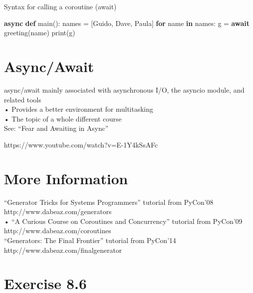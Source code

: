 \documentclass[
  letterpaper,
  DIV=11,
  numbers=noendperiod]{scrreprt}
\newenvironment{Shaded}{\begin{snugshade}}{\end{snugshade}}
\newcommand{\BuiltInTok}[1]{\textcolor[rgb]{0.00,0.23,0.31}{#1}}
\newcommand{\ControlFlowTok}[1]{\textcolor[rgb]{0.00,0.23,0.31}{\textbf{#1}}}
\newcommand{\KeywordTok}[1]{\textcolor[rgb]{0.00,0.23,0.31}{\textbf{#1}}}
\newcommand{\NormalTok}[1]{\textcolor[rgb]{0.00,0.23,0.31}{#1}}
\newcommand{\OperatorTok}[1]{\textcolor[rgb]{0.37,0.37,0.37}{#1}}
\newcommand{\StringTok}[1]{\textcolor[rgb]{0.13,0.47,0.30}{#1}}
\begin{document}
Syntax for calling a coroutine (await)

\begin{Shaded}
\begin{Highlighting}[]
\ControlFlowTok{async} \KeywordTok{def}\NormalTok{ main(): names }\OperatorTok{=}\NormalTok{ [}\StringTok{\textquotesingle{}Guido\textquotesingle{}}\NormalTok{, }\StringTok{\textquotesingle{}Dave\textquotesingle{}}\NormalTok{, }\StringTok{\textquotesingle{}Paula\textquotesingle{}}\NormalTok{] }\ControlFlowTok{for}\NormalTok{ name }\KeywordTok{in}\NormalTok{ names: g }\OperatorTok{=} \ControlFlowTok{await}\NormalTok{ greeting(name) }\BuiltInTok{print}\NormalTok{(g) }
\end{Highlighting}
\end{Shaded}


\chapter{Async/Await}\label{asyncawait-1}

async/await mainly associated with asynchronous I/O, the asyncio module,
and related tools\\
• Provides a better environment for multitasking\\
• The topic of a whole different course\\
See: ``Fear and Awaiting in Async''

https://www.youtube.com/watch?v=E-1Y4kSsAFc


\chapter{More Information}\label{more-information}

``Generator Tricks for Systems Programmers'' tutorial from PyCon'08
http://www.dabeaz.com/generators\\
• ``A Curious Course on Coroutines and Concurrency'' tutorial from
PyCon'09 http://www.dabeaz.com/coroutines\\
``Generators: The Final Frontier'' tutorial from PyCon'14
http://www.dabeaz.com/finalgenerator


\chapter{Exercise 8.6}\label{exercise-8.6}
\end{document}
